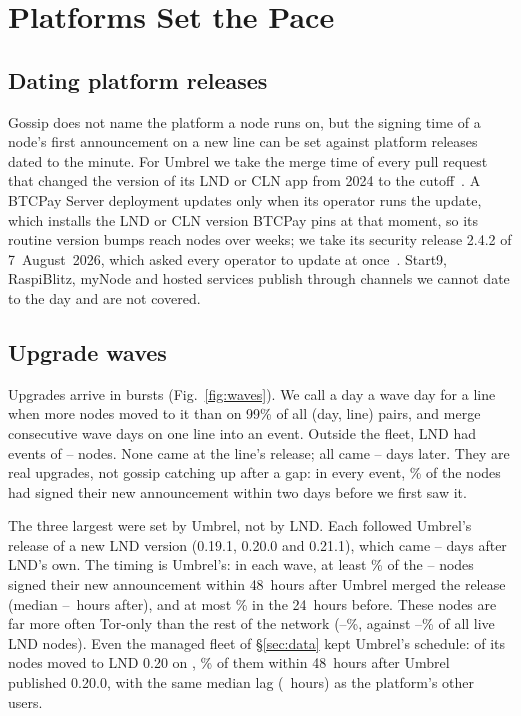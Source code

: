 \section{Platforms Set the Pace}
\label{sec:waves}

\subsection{Dating platform releases}
Gossip does not name the platform a node runs on, but the signing time of a node's first announcement on a new line
can be set against platform releases dated to the minute. For Umbrel we take the merge time of every pull request
that changed the version of its LND or CLN app from 2024 to the cutoff~\cite{umbrel2026apps}. A BTCPay Server
deployment updates only when its operator runs the update, which installs the LND or CLN version BTCPay pins at that
moment, so its routine version bumps reach nodes over weeks; we take its security release 2.4.2 of 7~August~2026,
which asked every operator to update at once~\cite{btcpay2026advisory}. Start9, RaspiBlitz, myNode and hosted
services publish through channels we cannot date to the day and are not covered.

\subsection{Upgrade waves}
Upgrades arrive in bursts (Fig.~\ref{fig:waves}). We call a day a wave day for a line when more nodes moved to it
than on 99\% of all (day, line) pairs, and merge consecutive wave days on one line into an event. Outside the fleet,
LND had \NWaveEvents{} events of \WaveMinNodes--\WaveMaxNodes{} nodes. None came at the line's release; all came
\WaveMinDays--\WaveMaxDays{} days later. They are real upgrades, not gossip catching up after a gap: in every
event, \WaveMinSignedTwo\% of the nodes had signed their new announcement within two days before we first saw it.

The three largest were set by Umbrel, not by LND. Each followed Umbrel's release of a new LND version (0.19.1, 0.20.0
and 0.21.1), which came \WaveUmbrelDaysMin--\WaveUmbrelDaysMax{} days after LND's own. The timing is Umbrel's: in
each wave, at least \WaveUmbrelSignedMin\% of the \WaveUmbrelMinNodes--\WaveUmbrelMaxNodes{} nodes signed their new
announcement within 48~hours after Umbrel merged the release (median \WaveUmbrelHoursMin--\WaveUmbrelHoursMax{}~hours
after), and at most \WaveUmbrelBeforeMax\% in the 24~hours before. These nodes are far more often Tor-only than the
rest of the network (\WaveUmbrelTorMin--\WaveUmbrelTorMax\%, against \WaveUmbrelBaseMin--\WaveUmbrelBaseMax\% of all
live LND nodes). Even the managed fleet of \S\ref{sec:data} kept Umbrel's schedule: \FleetWaveNodes{} of its nodes
moved to LND 0.20 on \FleetWaveDay{}, \FleetWaveSigned\% of them within 48~hours after Umbrel published 0.20.0, with
the same median lag (\FleetWaveHours{}~hours) as the platform's other users.

